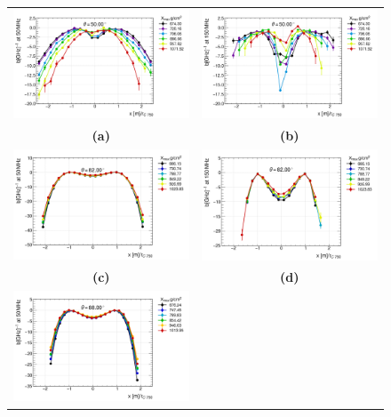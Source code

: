 \begin{figure}[th!]
\centering
\begin{tabular}{cc}
    \includegraphics[width=0.45\linewidth]{spec_Indx50_50.png} &
    \includegraphics[width=0.45\linewidth]{spec_Indx50_150.png}\\
    \textbf{(a)} & \textbf{(b)} \\
    \includegraphics[width=0.45\linewidth]{spec_Indx82_50.png}&
    \includegraphics[width=0.45\linewidth]{spec_Indx82_150.png}\\
    \textbf{(c)} & \textbf{(d)} \\
    \includegraphics[width=0.45\linewidth]{spec_Indx88_50.png} &

\end{tabular}
\end{figure}
